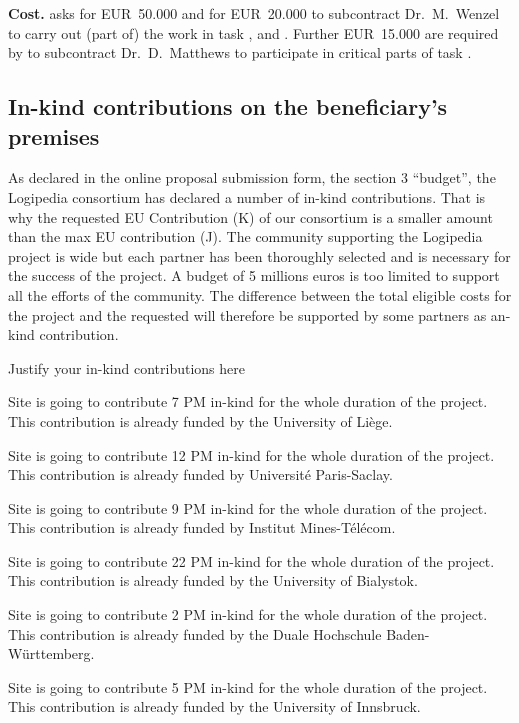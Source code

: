 {\bf Cost.}  asks for
EUR~50.000 and  for EUR~20.000 to subcontract Dr.\ M.\ Wenzel to
carry out (part of) the work in task
,  and
. Further EUR~15.000 are required
by  to subcontract Dr.\ D.\ Matthews to participate in
critical parts of task .

\subsection{In-kind contributions on the beneficiary’s premises}

As declared in the online proposal submission form, the section 3
``budget'', the Logipedia consortium has declared a number of in-kind
contributions. That is why the requested EU Contribution (K) of our
consortium is a smaller amount than the max EU contribution (J). The
community supporting the Logipedia project is wide but each partner
has been thoroughly selected and is necessary for the success of the
project. A budget of 5 millions euros is too limited to support all
the efforts of the community. The difference between the total
eligible costs for the project and the requested will therefore be
supported by some partners as an-kind contribution.

{\color{red} Justify your in-kind contributions here}

Site  is going to contribute 7 PM in-kind for the whole duration of the project.
This contribution is already funded by the University of Liège.

Site  is going to contribute 12 PM in-kind for the whole duration of the project.
This contribution is already funded by Université Paris-Saclay.

Site  is going to contribute 9 PM in-kind for the whole duration of the project.
This contribution is already funded by Institut Mines-Télécom.

Site  is going to contribute 22 PM in-kind for the whole duration of the project.
This contribution is already funded by the University of Bialystok.

Site  is going to contribute 2 PM in-kind for the whole duration of the project.
This contribution is already funded by the Duale Hochschule Baden-Württemberg.

Site  is going to contribute 5 PM in-kind for the whole duration of the project.
This contribution is already funded by the University of Innsbruck.

